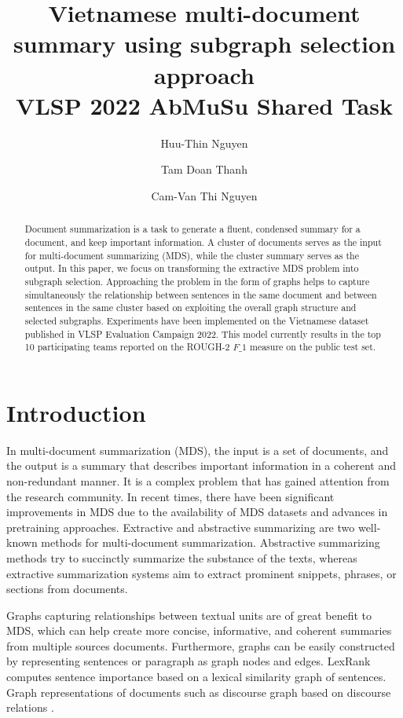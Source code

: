 \documentclass[11pt]{article}
\title{Vietnamese multi-document summary using subgraph selection approach\\ VLSP 2022 AbMuSu Shared Task}
\author[1]{Huu-Thin Nguyen}
\author[1 2]{Tam Doan Thanh}
\author[1]{Cam-Van Thi Nguyen}
\affil[ ]{\{18021221, vanntc\}@vnu.edu.vn}
\affil[ ]{tamdt9@viettel.com.vn}
\affil[1]{VNU University of Engineering and Technology (VNU-UET)}
\affil[2]{Viettel Group}
\begin{document}
\maketitle
\begin{abstract}
Document summarization is a task to generate a
fluent, condensed summary for a document, and
keep important information. A cluster of documents serves as the input for multi-document summarizing (MDS), while the cluster summary serves as the output. In this paper, we focus on transforming the extractive MDS problem into subgraph selection. Approaching the problem in the form of graphs helps to capture simultaneously the relationship between sentences in the same document and between sentences in the same cluster based on exploiting the overall graph structure and selected subgraphs.
Experiments have been implemented on the Vietnamese dataset published in VLSP Evaluation Campaign 2022.
This model currently results in the top 10 participating teams reported on the ROUGH-2 $F\_1$ measure on the public test set.

\end{abstract}

\section{Introduction}
In multi-document summarization (MDS), the input is a set of documents, and the output is a summary that describes important information in a coherent and non-redundant manner.  It is a complex problem that has gained attention from the research community. In recent times, there have been significant improvements in MDS due to the availability of MDS datasets and advances in pretraining approaches.
Extractive and abstractive summarizing are two well-known methods for multi-document summarization. Abstractive summarizing methods try to succinctly summarize the substance of the texts, whereas extractive summarization systems aim to extract prominent snippets, phrases, or sections from documents.

Graphs capturing relationships between textual units are of great benefit to MDS, which can help create more concise, informative, and coherent summaries from multiple sources documents. Furthermore, graphs can be easily constructed by representing sentences or paragraph as graph nodes and edges. LexRank \cite{erkan2004lexrank} computes sentence importance based on a lexical similarity graph of sentences. Graph representations of documents such as discourse graph based on discourse relations \cite{christensen2013towards}. 
\end{document}
